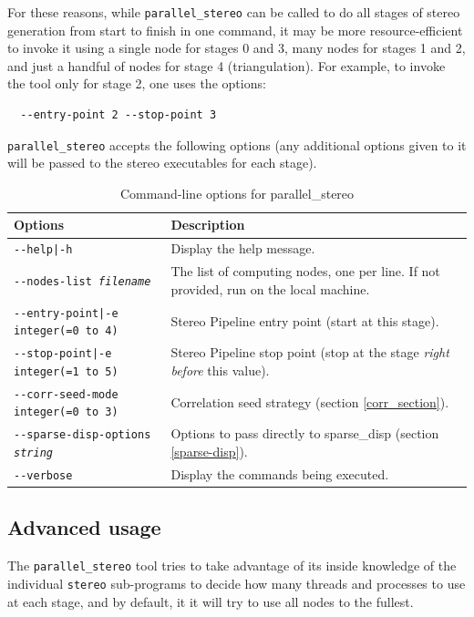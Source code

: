 For these reasons, while \texttt{parallel\_stereo} can be called to do
all stages of stereo generation from start to finish in one command, it
may be more resource-efficient to invoke it using a single node for
stages 0 and 3, many nodes for stages 1 and 2, and just a handful of
nodes for stage 4 (triangulation). For example, to invoke the tool
only for stage 2, one uses the options:

\begin{verbatim}
  --entry-point 2 --stop-point 3
\end{verbatim}

\texttt{parallel\_stereo} accepts the following options (any additional
options given to it will be passed to the stereo executables
for each stage).

\begin{longtable}{|l|p{7.5cm}|}
\caption{Command-line options for parallel\_stereo}
\label{tbl:parallelstereo}
\endfirsthead
\endhead
\endfoot
\endlastfoot
\hline
Options & Description \\ \hline \hline
\texttt{-\/-help|-h} & Display the help message.\\ \hline
\texttt{-\/-nodes-list \textit{filename} } & The list of computing nodes,
one per line. If not provided, run on the local machine. \\ \hline
\texttt{-\/-entry-point|-e integer(=0 to 4)} & Stereo Pipeline entry
point (start at this stage). \\ \hline
\texttt{-\/-stop-point|-e integer(=1 to 5)} & Stereo Pipeline stop point
(stop at the stage {\it right before} this value). \\ \hline
\texttt{-\/-corr-seed-mode integer(=0 to 3)} & Correlation seed strategy
(section \ref{corr_section}). \\ \hline
\texttt{-\/-sparse-disp-options \textit{string} } & Options to pass directly
to sparse\_disp (section \ref{sparse-disp}). \\ \hline
\texttt{-\/-verbose } & Display the commands being executed. \\ \hline
\end{longtable}

\subsection{Advanced usage}

The \texttt{parallel\_stereo} tool tries to take advantage of its inside
knowledge of the individual \texttt{stereo} sub-programs to decide
how many threads and processes to use at each stage, and by default, it
it will try to use all nodes to the fullest.

